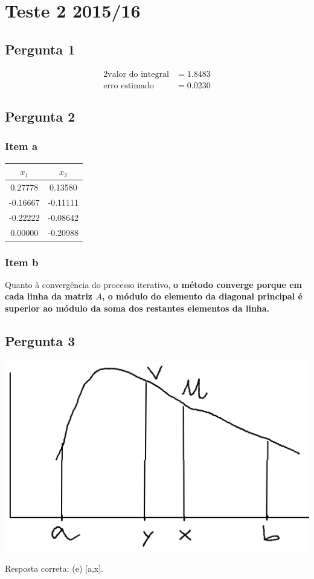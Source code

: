 \setcounter{chapter}{14}
\chapter{Teste 2 2015/16}
{
\renewcommand{\thesubsection}{\thesection\alph{subsection}}
\section{Pergunta 1}

\begin{alignat*}{2}
	\text{valor do integral} &= 1.8483\\
	\text{erro estimado}     &= 0.0230
\end{alignat*}

\section{Pergunta 2}
\subsection{Item a}

\begin{center} \begin{tabular}{c | c}
	$x_1   $ & $x_2$ \\ \hline
	 0.27778 &  0.13580 \\
	-0.16667 & -0.11111 \\
	-0.22222 & -0.08642 \\
	 0.00000 & -0.20988
\end{tabular} \end{center}
\subsection{Item b}
Quanto à convergência do processo iterativo, \textbf{o método converge porque em cada linha da matriz $A$, o módulo do elemento da diagonal principal é superior ao módulo da soma dos restantes elementos da linha.}

\section{Pergunta 3}
\begin{center} \includegraphics[scale=0.5]{2015T2_3} \end{center}
Resposta correta: (e) [a,x].
}
